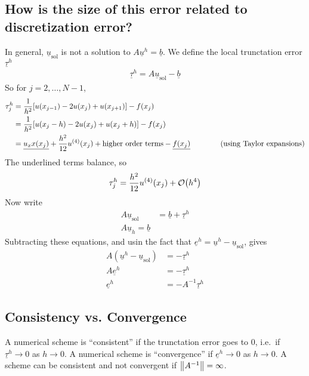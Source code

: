 \documentclass{article}
\begin{document}
        \subsection{How is the size of this error related to discretization error?}
            In general, $\underline{u}_\text{sol}$ is not a solution to $A\underline{u}^h = \underline{b}$.  We define the local trunctation error $\underline{\tau}^h$
            \begin{align}
                \underline{\tau}^h = A\underline{u}_\text{sol} - \underline{b}
            \end{align}
            So for $j = 2, \dots, N-1$,
            \begin{align}
                \tau_j^h &= \frac{1}{h^2}\qty[u(x_{j-1}) - 2u(x_j) + u(x_{j+1})] - f(x_j) \\
                &= \frac{1}{h^2}\qty[u(x_j - h) - 2u(x_j) + u(x_j+h)] - f(x_j) \\
                &= \underline{u_xx(x_j)} + \frac{h^2}{12}u^{(4)}(x_j) + \text{higher order terms} - \underline{f(x_j)} \qquad \qquad \text{(using Taylor expansions)}
            \end{align}
            The underlined terms balance, so
            \begin{align}
                \tau_j^h = \frac{h^2}{12}u^{(4)}(x_j) + \order{h^4}
            \end{align}
            Now write
            \begin{align}
                A\underline{u}_\text{sol} &= \underline{b} + \underline{\tau}^h \\
                A\underline{u}_h = \underline{b}
            \end{align}
            Subtracting these equations, and usin the fact that $\underline{e}^h = \underline{u}^h - \underline{u}_\text{sol}$, gives
            \begin{align}
                A(\underline{u}^h - \underline{u}_\text{sol}) &= -\underline{\tau}^h \\
                A\underline{e}^h &= -\underline{\tau}^h \\
                \underline{e}^h &= -A^{-1}\underline{\tau}^h
            \end{align}
        \subsection{Consistency vs. Convergence}
            A numerical scheme is ``consistent'' if the trunctation error goes to $0$, i.e.~if $\underline{\tau}^h \rightarrow 0$ as $h \rightarrow 0$.  A numerical scheme is ``convergence'' if $\underline{e}^h \rightarrow 0$ as $h \rightarrow 0$.  {\color{blue}A scheme can be consistent and not convergent if $\norm{A^{-1}} = \infty$.}
\end{document}
